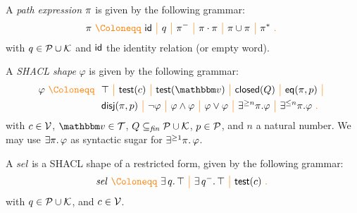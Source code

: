 


\begin{definition}
  A \emph{path expression} $\pi$ is given by the following grammar:
  \[
    \pathExpr
  \gDef
        \id
  \gMid q
  \gMid \pathExpr^{-}
  \gMid \pathExpr \cdot \pathExpr
  \gMid \pathExpr \cup \pathExpr
  \gMid \pathExpr^{*}
  \gEnd
  \]
  with $q \in \mathcal{P} \cup \mathcal{K}$ and $\mathsf{id}$ the identity relation (or empty
  word).
\end{definition}

\begin{definition}
  \label{def:shacl-shape}
  A \emph{SHACL shape} $\varphi$ is given by the following grammar:
  \begin{align*}
    \varphi
  \gDef \
  & \top
  \gMid \hasvalue(c)
  \gMid \test(\vtype)
  \gMid \closed(Q)
  \gMid \eq(\pathExpr, p)
  \gMid \\
  & \disj(\pathExpr, p)
  \gMid \neg \varphi
  \gMid \varphi \land \varphi
  \gMid \varphi \lor \varphi
  \gMid \geqn{n}{\pathExpr}{\varphi}
  \gMid \leqn{n}{\pathExpr}{\varphi}
  \gEnd
  \end{align*}
  with $c \in \mathcal{V}$, $\vtype \in \ValueTypes$, $Q \subseteq_{\mathit{fin}}
  \mathcal{P} \cup \mathcal{K}$, $p \in \mathcal{P}$, and $n$ a natural number.
  We may use $\exists \pi \ldotp \varphi$ as syntactic sugar for
  $\exists^{\geq 1} \pi \ldotp \varphi$.
\end{definition}

\begin{definition}
  A \selTerm $\mathit{sel}$ is a SHACL shape of a restricted form, given by the
  following grammar:
  \[
    \mathit{sel}
  \gDef
        \exists\, q \ldotp \top
  \gMid \exists\, q^{-} \ldotp \top
  \gMid \hasvalue(c)
  \gEnd
  \]
  with $q \in \mathcal{P} \cup \mathcal{K}$, and
  $c \in \mathcal{V}$.
\end{definition}


